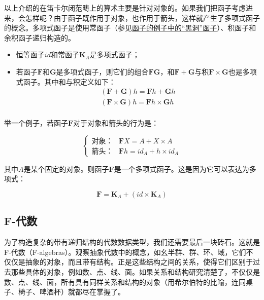 \documentclass{article}
\begin{document}
以上介绍的在笛卡尔闭范畴上的算术主要是针对对象的。如果我们把函子考虑进来，会怎样呢？由于函子既作用于对象，也作用于箭头，这样就产生了多项式函子的概念。多项式函子是使用常函子（参见\hyperref[sec:functor:examples]{函子的例子中的“黑洞”函子}）、积函子和余积函子递归构造的。

\begin{itemize}
  \item 恒等函子$id$和常函子$\mathbf{K}_A$是多项式函子；
  \item 若函子$\mathbf{F}$和$\mathbf{G}$是多项式函子，则它们的组合$\mathbf{FG}$，和$\mathbf{F} + \mathbf{G}$与积$\mathbf{F} \times \mathbf{G}$也是多项式函子。其中和与积定义如下：
  \[
    \begin{array}{l}
    (\mathbf{F} + \mathbf{G}) h = \mathbf{F} h + \mathbf{G} h \\
    (\mathbf{F} \times \mathbf{G}) h = \mathbf{F} h \times \mathbf{G} h \\
    \end{array}
  \]
\end{itemize}

举一个例子，若函子$\mathbf{F}$对于对象和箭头的行为是：

\[
\begin{cases}
\text{对象：} & \mathbf{F} X = A + X \times A \\
\text{箭头：} & \mathbf{F} h = id_A + h \times id_A
\end{cases}
\]

其中$A$是某个固定的对象。则函子$\mathbf{F}$是一个多项式函子。这是因为它可以表达为多项式：

\[
\mathbf{F} = \mathbf{K}_A + (id \times \mathbf{K}_A)
\]

\subsection{F-代数}

为了构造复杂的带有递归结构的代数数据类型，我们还需要最后一块砖石。这就是F-代数（F-algebras）。观察抽象代数中的概念，如幺半群、群、环、域，它们不仅仅是抽象的对象，而且带有结构。正是这些结构之间的关系，使得它们区别于过去那些具体的对象，例如数、点、线、面。如果关系和结构研究清楚了，不仅仅是数、点、线、面，所有具有同样关系和结构的对象（用希尔伯特的比喻，连同桌子、椅子、啤酒杯）就都尽在掌握了。
\end{document}
